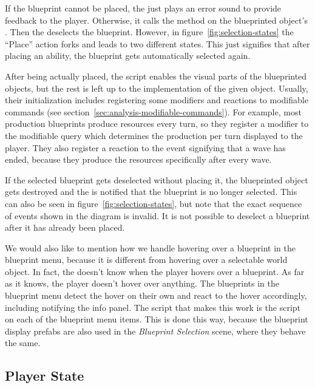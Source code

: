 If the blueprint cannot be placed, the  just plays an error sound to provide feedback to the player.
Otherwise, it calls the  method on the blueprinted object's .
Then the  deselects the blueprint.
However, in figure~\ref{fig:selection-states} the \enquote{Place} action forks and leads to two different states.
This just signifies that after placing an ability, the blueprint gets automatically selected again.

After being actually placed, the  script enables the visual parts of the blueprinted objects, but the rest is left up to the implementation of the given object.
Usually, their initialization includes registering some modifiers and reactions to modifiable commands (see section~\ref{sec:analysis-modifiable-commands}).
For example, most production blueprints produce resources every turn, so they register a modifier to the modifiable query which determines the production per turn displayed to the player.
They also register a reaction to the event signifying that a wave has ended, because they produce the resources specifically after every wave.

If the selected blueprint gets deselected without placing it, the blueprinted object gets destroyed and the  is notified that the blueprint is no longer selected.
This can also be seen in figure~\ref{fig:selection-states}, but note that the exact sequence of events shown in the diagram is invalid.
It is not possible to deselect a blueprint after it has already been placed.

We would also like to mention how we handle hovering over a blueprint in the blueprint menu, because it is different from hovering over a selectable world object.
In fact, the  doesn't know when the player hovers over a blueprint.
As far as it knows, the player doesn't hover over anything.
The blueprints in the blueprint menu detect the hover on their own and react to the hover accordingly, including notifying the info panel.
The script that makes this work is the  script on each of the blueprint menu items.
This is done this way, because the blueprint display prefabs are also used in the \emph{Blueprint Selection} scene, where they behave the same.

\subsection{Player State}

